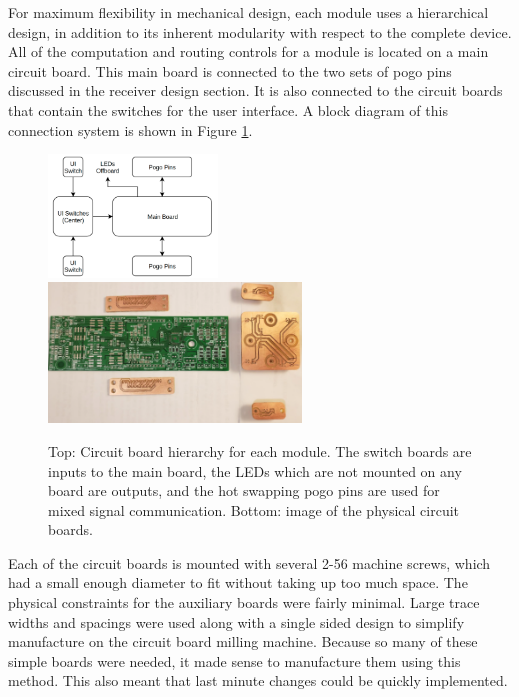 	For maximum flexibility in mechanical design, each module uses a hierarchical design, in addition to its inherent modularity with respect to the complete device.  All of the computation and routing controls for a module is located on a main circuit board. This main board is connected to the two sets of pogo pins discussed in the receiver design section. It is also connected to the circuit boards that contain the switches for the user interface. A block diagram of this connection system is shown in Figure \ref{fig:ModulePCBHierarchy}.

	\begin{figure}
		\centering
		\includegraphics[width = 0.4\textwidth]{PR5Images/PCBHierarchy.png}
		\includegraphics[width = 0.6\textwidth, angle = 180]{PR5Images/PCBs.png}
		\caption{Top: Circuit board hierarchy for each module.  The switch boards are inputs to the main board, the LEDs which are not mounted on any board are outputs, and the hot swapping pogo pins are used for mixed signal communication.  Bottom: image of the physical circuit boards.}
		\label{fig:ModulePCBHierarchy}
	\end{figure}

	Each of the circuit boards is mounted with several 2-56 machine screws, which had a small enough diameter to fit without taking up too much space. The physical constraints for the auxiliary boards were fairly minimal. Large trace widths and spacings were used along with a single sided design to simplify manufacture on the circuit board milling machine. Because so many of these simple boards were needed, it made sense to manufacture them using this method. This also meant that last minute changes could be quickly implemented.

